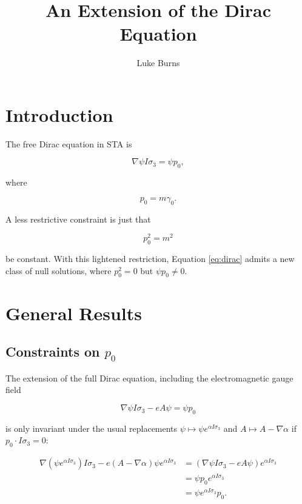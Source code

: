 \documentclass{article}
\title{An Extension of the Dirac Equation}
\author{Luke Burns}
\begin{document}
  \maketitle

  \section{Introduction}

  The free Dirac equation in STA is

  \begin{equation}
    \nabla \psi I \sigma_3 = \psi p_0, \label{eq:dirac}
  \end{equation}

  where

  \begin{equation}
    p_0 = m \gamma_0. \label{eq:mass}
  \end{equation} 

  A less restrictive constraint is just that

  \begin{equation}
    p_0^2 = m^2
  \end{equation}

  be constant. With this lightened restriction, Equation \ref{eq:dirac} admits a new class of null solutions, where $p_0^2 = 0$ but $\psi p_0 \not = 0$.

  \section{General Results}

\subsection{Constraints on $p_0$}

  The extension of the full Dirac equation, including the electromagnetic gauge field

  \begin{equation}
    \nabla \psi I \sigma_3 - e A \psi = \psi p_0 \label{eq:full}
  \end{equation}

  is only invariant under the usual replacements $\psi \mapsto \psi e^{\alpha I \sigma_3}$ and $A \mapsto A - \nabla \alpha$ if $p_0 \cdot I\sigma_3 = 0$:

  \begin{align}
    \nabla (\psi e^{\alpha I \sigma_3}) I \sigma_3 - e (A - \nabla \alpha) \psi e^{\alpha I \sigma_3} &= (\nabla \psi I \sigma_3  - e A \psi) e^{\alpha I \sigma_3} \\
     &= \psi p_0 e^{\alpha I \sigma_3} \\
     &= \psi e^{\alpha I \sigma_3} p_0.
  \end{align}
\end{document}
